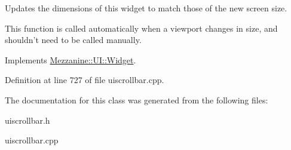 Updates the dimensions of this widget to match those of the new screen size. 

This function is called automatically when a viewport changes in size, and shouldn't need to be called manually. 

Implements \hyperlink{classMezzanine_1_1UI_1_1Widget_af23f919f2912ac10230953a848c9889c}{Mezzanine::UI::Widget}.



Definition at line 727 of file uiscrollbar.cpp.



The documentation for this class was generated from the following files:\begin{DoxyCompactItemize}
\item 
uiscrollbar.h\item 
uiscrollbar.cpp\end{DoxyCompactItemize}
